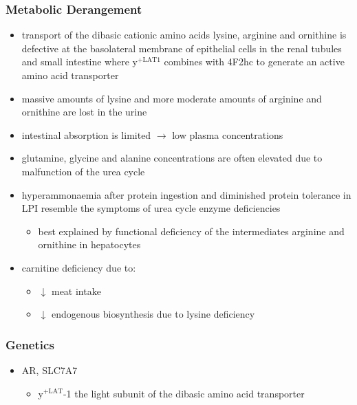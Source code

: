 \documentclass{scrartcl}
\begin{document}
\subsubsection{Metabolic Derangement}
\label{sec:org58c2d4f}
\begin{itemize}
\item transport of the dibasic cationic amino acids lysine, arginine and
ornithine is defective at the basolateral membrane of epithelial
cells in the renal tubules and small intestine where y\(^{\text{+LAT1}}\)
combines with 4F2hc to generate an active amino acid transporter
\item massive amounts of lysine and more moderate amounts of arginine and
ornithine are lost in the urine
\item intestinal absorption is limited \(\to\) low plasma concentrations
\item glutamine, glycine and alanine concentrations are often elevated due
to malfunction of the urea cycle
\item hyperammonaemia after protein ingestion and diminished protein
tolerance in LPI resemble the symptoms of urea cycle enzyme
deficiencies
\begin{itemize}
\item best explained by functional deficiency of the intermediates
arginine and ornithine in hepatocytes
\end{itemize}
\item carnitine deficiency due to:
\begin{itemize}
\item \(\downarrow\) meat intake
\item \(\downarrow\) endogenous biosynthesis due to lysine deficiency
\end{itemize}
\end{itemize}

\subsubsection{Genetics}
\label{sec:org0f97962}
\begin{itemize}
\item AR, SLC7A7
\begin{itemize}
\item y\(^{\text{+LAT}}\)-1 the light subunit of the dibasic amino acid
transporter
\end{itemize}
\end{itemize}
\end{document}
